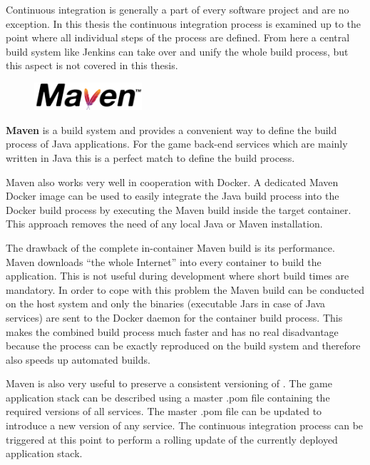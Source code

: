 Continuous integration is generally a part of every software project and \ogs{}
are no exception. In this thesis the continuous integration process is examined
up to the point where all individual steps of the process are defined. From here
a central build system like Jenkins can take over and unify the whole build
process, but this aspect is not covered in this thesis.\\

\begin{figure}
    \includegraphics[width=4cm]{images/dependencies/maven}
\end{figure}

\noindent\textbf{Maven} is a build system and provides a convenient way to
define the build process of Java applications. For the game back-end services
which are mainly written in Java this is a perfect match to define the build
process.

Maven also works very well in cooperation with Docker. A dedicated Maven Docker
image can be used to easily integrate the Java build process into the Docker
build process by executing the Maven build inside the target container. This approach
removes the need of any local Java or Maven installation. 

The drawback of the complete in-container Maven build is its performance.
Maven downloads ``the whole Internet'' into every container to build the
application. This is not useful during development where short build times are
mandatory. In order to cope with this problem the Maven build can be conducted
on the host system and only the binaries (executable Jars in case of Java
services) are sent to the Docker daemon for the container build process. This
makes the combined build process much faster and has no real disadvantage
because the process can be exactly reproduced on the build system and therefore
also speeds up automated builds.

Maven is also very useful to preserve a consistent versioning of \mss{}. The
game application stack can be described using a master .pom file containing
the required versions of all services. The master .pom file can be updated to
introduce a new version of any service. The continuous integration process can
be triggered at this point to perform a rolling update of the currently
deployed application stack.\\
	


